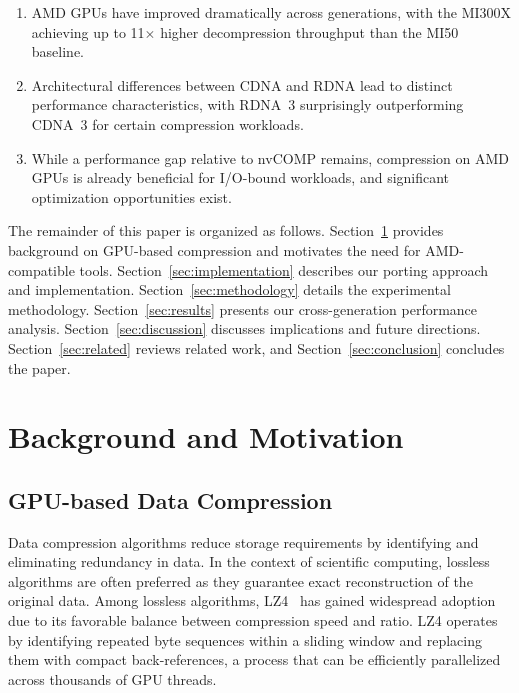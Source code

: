 \documentclass[runningheads]{llncs}
\begin{document}
\begin{enumerate}
    \item AMD GPUs have improved dramatically across generations, with the MI300X achieving up to 11$\times$ higher decompression throughput than the MI50 baseline.
    \item Architectural differences between CDNA and RDNA lead to distinct performance characteristics, with RDNA~3 surprisingly outperforming CDNA~3 for certain compression workloads.
    \item While a performance gap relative to nvCOMP remains, compression on AMD GPUs is already beneficial for I/O-bound workloads, and significant optimization opportunities exist.
\end{enumerate}

The remainder of this paper is organized as follows. Section~\ref{sec:background} provides background on GPU-based compression and motivates the need for AMD-compatible tools. Section~\ref{sec:implementation} describes our porting approach and implementation. Section~\ref{sec:methodology} details the experimental methodology. Section~\ref{sec:results} presents our cross-generation performance analysis. Section~\ref{sec:discussion} discusses implications and future directions. Section~\ref{sec:related} reviews related work, and Section~\ref{sec:conclusion} concludes the paper.





%

\section{Background and Motivation}
\label{sec:background}

\subsection{GPU-based Data Compression}

Data compression algorithms reduce storage requirements by identifying and eliminating redundancy in data. In the context of scientific computing, lossless algorithms are often preferred as they guarantee exact reconstruction of the original data. Among lossless algorithms, LZ4~\cite{lz4} has gained widespread adoption due to its favorable balance between compression speed and ratio. LZ4 operates by identifying repeated byte sequences within a sliding window and replacing them with compact back-references, a process that can be efficiently parallelized across thousands of GPU threads.
\end{document}
